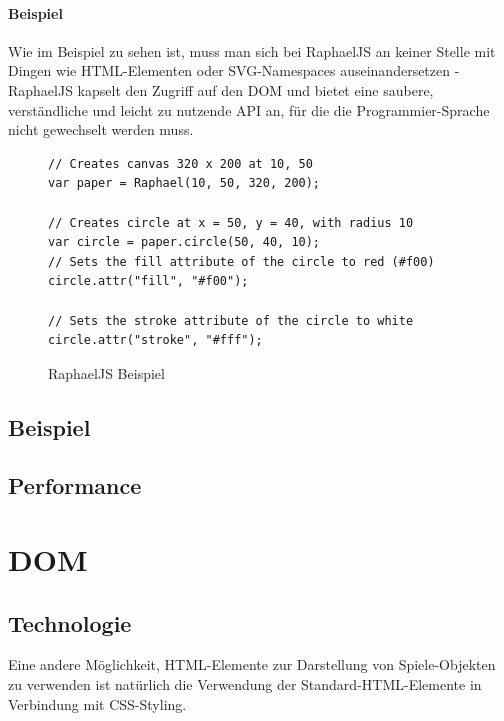 \documentclass[a4paper, 12pt]{article}
\begin{document}
\paragraph{Beispiel}
Wie im Beispiel zu sehen ist, muss man sich bei RaphaelJS an keiner Stelle mit Dingen wie HTML-Elementen oder SVG-Namespaces auseinandersetzen - RaphaelJS kapselt den Zugriff auf den DOM und bietet eine saubere, verständliche und leicht zu nutzende API an, für die die Programmier-Sprache nicht gewechselt werden muss. 
\begin{figure}[h!]
	\begin{verbatim}
// Creates canvas 320 x 200 at 10, 50
var paper = Raphael(10, 50, 320, 200);

// Creates circle at x = 50, y = 40, with radius 10
var circle = paper.circle(50, 40, 10);
// Sets the fill attribute of the circle to red (#f00)
circle.attr("fill", "#f00");

// Sets the stroke attribute of the circle to white
circle.attr("stroke", "#fff");	
	\end{verbatim}
	\caption{RaphaelJS Beispiel}
	\label{raphaeljs_example}
\end{figure}
\subsection{Beispiel}
\subsection{Performance}
\newpage
\section{DOM}
\subsection{Technologie}
Eine andere Möglichkeit, HTML-Elemente zur Darstellung von Spiele-Objekten zu verwenden ist natürlich die Verwendung der Standard-HTML-Elemente in Verbindung mit CSS-Styling.
\end{document}
